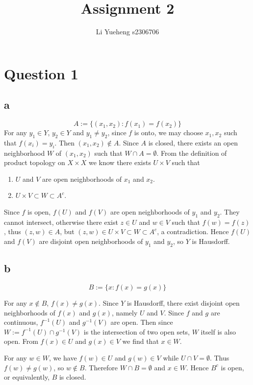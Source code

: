\documentclass{article}
\begin{document}
\title{Assignment 2}
\author{Li Yueheng s2306706}

\maketitle


\section*{Question 1}
\subsection*{a}
$$A:=\{(x_1,x_2):f(x_1)=f(x_2)\} $$
For any $y_1\in Y$, $y_2\in Y$ and $y_1\neq y_2$, since $f$ is onto, we may choose $x_1,x_2$ such that $f(x_i)=y_i$. Then $(x_1,x_2)\notin A$. Since $A$ is closed, there exists  an open neighborhood $W$ of $(x_1,x_2)$ such that $W\cap A=\emptyset$. From the definition of product topology on $X\times X$ we know there exists $U\times V$ such that 
\begin{enumerate}
	\item $U$ and $V$ are open neighborhoods of $x_1$ and $x_2$.
	\item $U\times V \subset W \subset A^c$.
\end{enumerate}
Since $f$ is open, $f(U)$ and $f(V)$ are open neighborhoods of $y_1$ and $y_2$. They cannot intersect, otherwise there exist $z\in U$ and $w\in V$ such that $f(w)=f(z)$, thus $(z,w)\in A$, but $(z,w)\in U\times V\subset W \subset A^c$, a contradiction. Hence $f(U)$ and $f(V)$ are disjoint open neighborhoods of $y_1$ and $y_2$, so $Y$ is Hausdorff.


\subsection*{b}
$$B:=\{x:f(x)=g(x)\}$$

For any $x\notin B$, $f(x)\neq g(x)$. Since $Y$ is Hausdorff, there exist disjoint open neighborhoods of $f(x)$ and $g(x)$, namely $U$ and $V$. Since $f$ and $g$ are continuous, $f^{-1}(U)$ and $g^{-1}(V)$ are open. Then since $W:=f^{-1}(U)\cap g^{-1}(V)$ is the intersection of two open sets, $W$ itself is also open. From $f(x)\in U$ and $g(x)\in V$ we find that $x\in W$. 

For any $w\in W$, we have $f(w)\in U$ and $g(w)\in V$ while $U\cap V=\emptyset$. Thus $f(w)\neq g(w)$, so $w\notin B$. Therefore $W\cap B=\emptyset$ and $x\in W$. Hence $B^c$ is open, or equivalently, $B$ is closed. 
\end{document}
